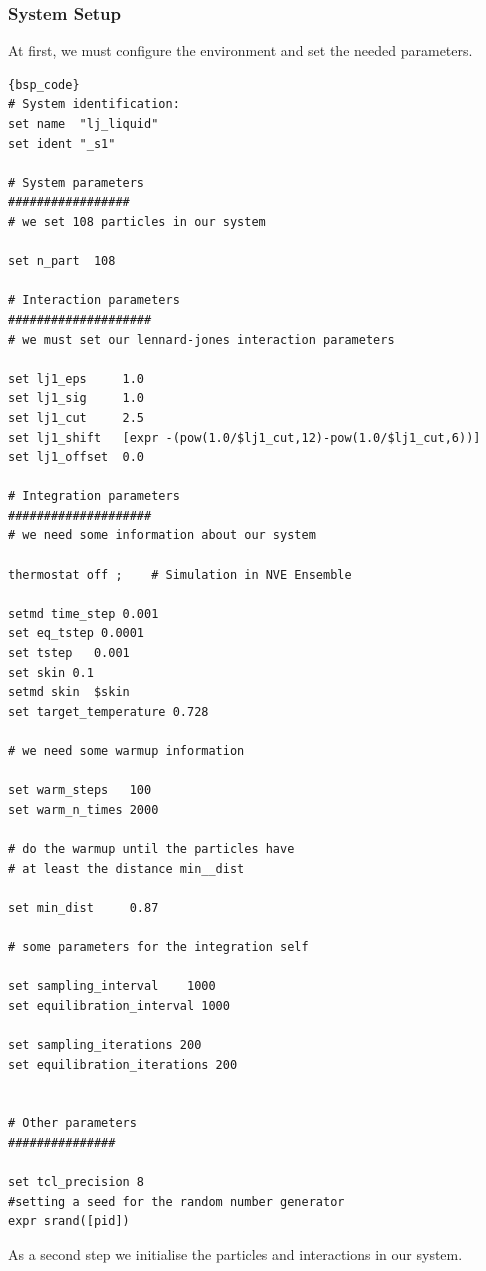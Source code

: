 \documentclass[
paper=a4,                       %
fontsize=11pt,                  %
twoside,                        %
footsepline,                    %
headsepline,                    %
headinclude=false,              %
footinclude=false,              %
pagesize,                       %
]{scrartcl}
\begin{document}
\subsubsection{System Setup}
At first, we must configure the environment and set the needed parameters.
{\small\vspace{0,2cm}
\begin{lstlisting}[firstnumber= auto]{bsp_code}
# System identification:
set name  "lj_liquid"
set ident "_s1"

# System parameters
#################
# we set 108 particles in our system

set n_part  108

# Interaction parameters
####################
# we must set our lennard-jones interaction parameters

set lj1_eps     1.0
set lj1_sig     1.0
set lj1_cut     2.5
set lj1_shift   [expr -(pow(1.0/$lj1_cut,12)-pow(1.0/$lj1_cut,6))]
set lj1_offset  0.0

# Integration parameters
####################
# we need some information about our system 

thermostat off ;	# Simulation in NVE Ensemble

setmd time_step 0.001 
set eq_tstep 0.0001
set tstep   0.001
set skin 0.1
setmd skin  $skin
set target_temperature 0.728

# we need some warmup information

set warm_steps   100
set warm_n_times 2000

# do the warmup until the particles have 
# at least the distance min__dist

set min_dist     0.87

# some parameters for the integration self

set sampling_interval    1000
set equilibration_interval 1000

set sampling_iterations 200
set equilibration_iterations 200


# Other parameters
###############

set tcl_precision 8
#setting a seed for the random number generator
expr srand([pid])
\end{lstlisting}}\vspace{0,2cm}
\noindent As a second step we initialise the particles and interactions in our system.
\end{document}
